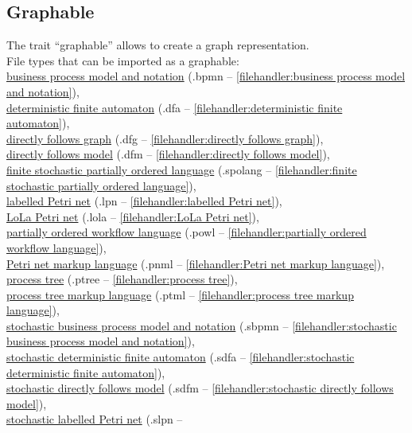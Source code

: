 {\subsection{Graphable}
\label{trait:graphable}
The trait ``graphable'' allows to create a graph representation.
\\File types that can be imported as a graphable: \\\null\qquad\hyperref[filehandler:business process model and notation]{business process model and notation} (.bpmn -- \cref{filehandler:business process model and notation}), \\\null\qquad\hyperref[filehandler:deterministic finite automaton]{deterministic finite automaton} (.dfa -- \cref{filehandler:deterministic finite automaton}), \\\null\qquad\hyperref[filehandler:directly follows graph]{directly follows graph} (.dfg -- \cref{filehandler:directly follows graph}), \\\null\qquad\hyperref[filehandler:directly follows model]{directly follows model} (.dfm -- \cref{filehandler:directly follows model}), \\\null\qquad\hyperref[filehandler:finite stochastic partially ordered language]{finite stochastic partially ordered language} (.spolang -- \cref{filehandler:finite stochastic partially ordered language}), \\\null\qquad\hyperref[filehandler:labelled Petri net]{labelled Petri net} (.lpn -- \cref{filehandler:labelled Petri net}), \\\null\qquad\hyperref[filehandler:LoLa Petri net]{LoLa Petri net} (.lola -- \cref{filehandler:LoLa Petri net}), \\\null\qquad\hyperref[filehandler:partially ordered workflow language]{partially ordered workflow language} (.powl -- \cref{filehandler:partially ordered workflow language}), \\\null\qquad\hyperref[filehandler:Petri net markup language]{Petri net markup language} (.pnml -- \cref{filehandler:Petri net markup language}), \\\null\qquad\hyperref[filehandler:process tree]{process tree} (.ptree -- \cref{filehandler:process tree}), \\\null\qquad\hyperref[filehandler:process tree markup language]{process tree markup language} (.ptml -- \cref{filehandler:process tree markup language}), \\\null\qquad\hyperref[filehandler:stochastic business process model and notation]{stochastic business process model and notation} (.sbpmn -- \cref{filehandler:stochastic business process model and notation}), \\\null\qquad\hyperref[filehandler:stochastic deterministic finite automaton]{stochastic deterministic finite automaton} (.sdfa -- \cref{filehandler:stochastic deterministic finite automaton}), \\\null\qquad\hyperref[filehandler:stochastic directly follows model]{stochastic directly follows model} (.sdfm -- \cref{filehandler:stochastic directly follows model}), \\\null\qquad\hyperref[filehandler:stochastic labelled Petri net]{stochastic labelled Petri net} (.slpn -- }

